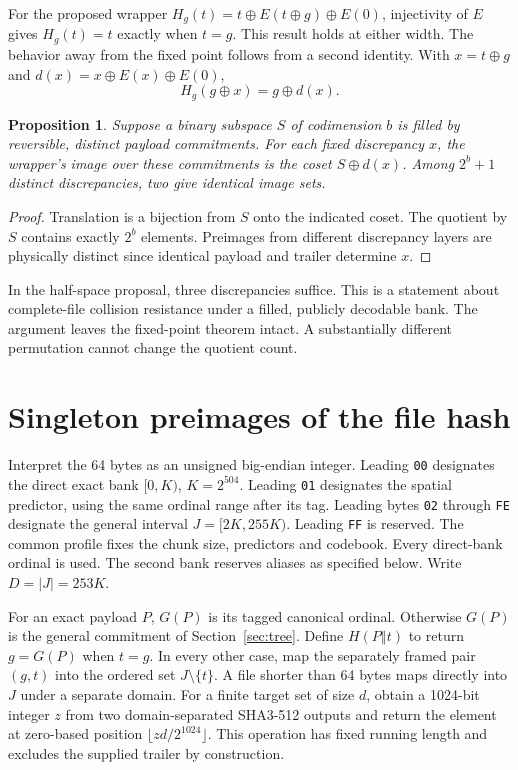 \documentclass[10pt,twocolumn,letterpaper]{article}
\newtheorem{prop}{Proposition}
\newcommand{\cat}{\mathbin\Vert}
\newcommand{\xor}{\mathbin\oplus}
\begin{document}
For the proposed wrapper \(H_g(t)=t\xor E(t\xor g)\xor E(0)\), injectivity of \(E\) gives \(H_g(t)=t\) exactly when \(t=g\). This result holds at either width. The behavior away from the fixed point follows from a second identity. With \(x=t\xor g\) and \(d(x)=x\xor E(x)\xor E(0)\),
\[
                     H_g(g\xor x)=g\xor d(x).
\]

\begin{prop}
Suppose a binary subspace \(S\) of codimension \(b\) is filled by reversible, distinct payload commitments. For each fixed discrepancy \(x\), the wrapper's image over these commitments is the coset \(S\xor d(x)\). Among \(2^b+1\) distinct discrepancies, two give identical image sets.
\end{prop}
\begin{proof}
Translation is a bijection from \(S\) onto the indicated coset. The quotient by \(S\) contains exactly \(2^b\) elements. Preimages from different discrepancy layers are physically distinct since identical payload and trailer determine \(x\).
\end{proof}
In the half-space proposal, three discrepancies suffice. This is a statement about complete-file collision resistance under a filled, publicly decodable bank. The argument leaves the fixed-point theorem intact. A substantially different permutation cannot change the quotient count.

\section{Singleton preimages of the file hash}
Interpret the 64 bytes as an unsigned big-endian integer. Leading \texttt{00} designates the direct exact bank \([0,K)\), \(K=2^{504}\). Leading \texttt{01} designates the spatial predictor, using the same ordinal range after its tag. Leading bytes \texttt{02} through \texttt{FE} designate the general interval \(J=[2K,255K)\). Leading \texttt{FF} is reserved. The common profile fixes the chunk size, predictors and codebook. Every direct-bank ordinal is used. The second bank reserves aliases as specified below. Write \(D=|J|=253K\).

For an exact payload \(P\), \(G(P)\) is its tagged canonical ordinal. Otherwise \(G(P)\) is the general commitment of Section~\ref{sec:tree}. Define \(H(P\cat t)\) to return \(g=G(P)\) when \(t=g\). In every other case, map the separately framed pair \((g,t)\) into the ordered set \(J\setminus\{t\}\). A file shorter than 64 bytes maps directly into \(J\) under a separate domain. For a finite target set of size \(d\), obtain a 1024-bit integer \(z\) from two domain-separated SHA3-512 outputs and return the element at zero-based position \(\lfloor zd/2^{1024}\rfloor\). This operation has fixed running length and excludes the supplied trailer by construction.
\end{document}
